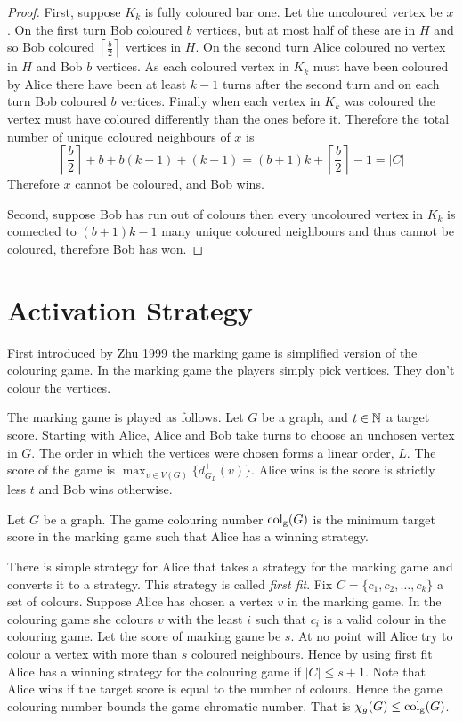 \begin{proof}
First, suppose $K_k$ is fully coloured bar one. Let the uncoloured vertex be $x$. On the first turn Bob coloured $b$ vertices, but at most half of these are in $H$ and so Bob coloured $\left\lceil \frac{b}{2}\right\rceil$ vertices in $H$. On the second turn Alice coloured no vertex in $H$ and Bob $b$ vertices. As each coloured vertex in $K_k$ must have been coloured by Alice there have been at least $k-1$ turns after the second turn and on each turn Bob coloured $b$ vertices. Finally when each vertex in $K_k$ was coloured the vertex must have coloured differently than the ones before it. Therefore the total number of unique coloured neighbours of $x$ is 
%
\[\left\lceil \frac{b}{2}\right\rceil+b +b(k-1)+(k-1)=(b+1)k+\left\lceil \frac{b}{2}\right\rceil-1 = |C|\]
%
Therefore $x$ cannot be coloured, and Bob wins.

Second, suppose Bob has run out of colours then every uncoloured vertex in $K_k$ is connected to $(b+1)k-1$ many unique coloured neighbours and thus cannot be coloured, therefore Bob has won.
\end{proof}

\section{Activation Strategy}

First introduced by  Zhu 1999 \cite{Zhu1999} the marking game is simplified version of the colouring game. In the marking game the players simply pick vertices. They don't colour the vertices. 

The marking game is played as follows. Let $G$ be a graph, and $t\in\mathbb{N}$ a target score. Starting with Alice, Alice and Bob take turns to choose an unchosen vertex in $G$. The order in which the vertices were chosen forms a linear order, $L$. The score of the game is $\max_{v\in V(G)}\{d^+_{G_L}(v)\}$. Alice wins is the score is strictly less $t$ and Bob wins otherwise. 
%
\begin{definition}
    Let $G$ be a graph. The game colouring number $\operatorname{col_g}(G)$ is the minimum target score in the marking game such that Alice has a winning strategy. 
\end{definition}
%
There is simple strategy for Alice that takes a strategy for the marking game and converts it to a strategy. This strategy is called \textit{first fit}. Fix $C=\{c_1,c_2,\dots,c_k\}$ a set of colours. Suppose Alice has chosen a vertex $v$ in the marking game. In the colouring game she colours $v$ with the least $i$ such that $c_i$ is a valid colour in the colouring game. Let the score of marking game be $s$. At no point will Alice try to colour a vertex with more than $s$ coloured neighbours. Hence by using first fit Alice has a winning strategy for the colouring game if $|C|\leq s+1$. Note that Alice wins if the target score is equal to the number of colours. Hence the game colouring number bounds the game chromatic number. That is $\chi_g(G)\leq\operatorname{col_g}(G)$.

